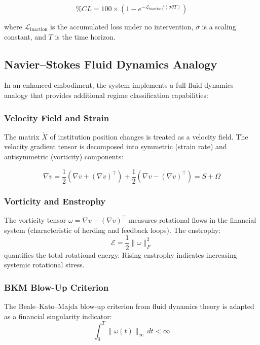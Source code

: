 \documentclass[12pt,a4paper]{article}
\begin{document}
\begin{equation}
\%CL = 100 \times \left(1 - e^{-\mathcal{L}_{\text{inaction}} / 
(\sigma \theta T)}\right)
\end{equation}

where $\mathcal{L}_{\text{inaction}}$ is the accumulated loss under no 
intervention, $\sigma$ is a scaling constant, and $T$ is the time horizon.

\subsection{Navier--Stokes Fluid Dynamics Analogy}

In an enhanced embodiment, the system implements a full fluid dynamics 
analogy that provides additional regime classification capabilities:

\subsubsection{Velocity Field and Strain}

The matrix $\dot{X}$ of institution position changes is treated as a 
velocity field. The velocity gradient tensor is decomposed into symmetric 
(strain rate) and antisymmetric (vorticity) components:

\begin{equation}
\nabla v = \frac{1}{2}(\nabla v + (\nabla v)^\top) + 
\frac{1}{2}(\nabla v - (\nabla v)^\top) = S + \Omega
\end{equation}

\subsubsection{Vorticity and Enstrophy}

The vorticity tensor $\omega = \nabla v - (\nabla v)^\top$ measures 
rotational flows in the financial system (characteristic of herding 
and feedback loops). The enstrophy:
\begin{equation}
\mathcal{E} = \frac{1}{2}\|\omega\|_F^2
\end{equation}
quantifies the total rotational energy. Rising enstrophy indicates 
increasing systemic rotational stress.

\subsubsection{BKM Blow-Up Criterion}

The Beale--Kato--Majda blow-up criterion from fluid dynamics theory is 
adapted as a financial singularity indicator:
\begin{equation}
\int_0^T \|\omega(t)\|_\infty \, dt < \infty
\end{equation}
\end{document}

